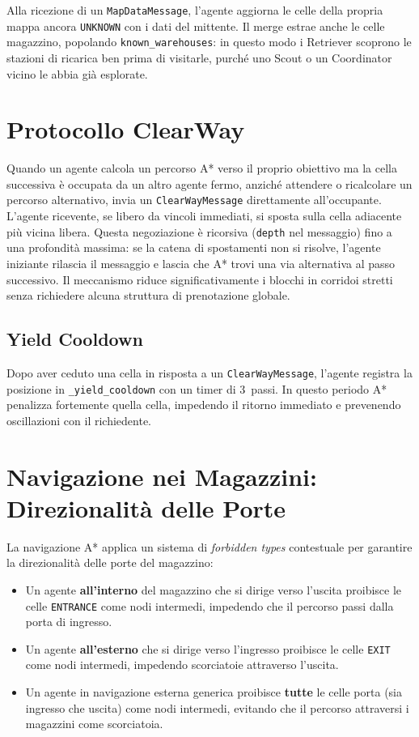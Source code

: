 Alla ricezione di un \texttt{MapDataMessage}, l'agente aggiorna le celle della propria
mappa ancora \texttt{UNKNOWN} con i dati del mittente. Il merge estrae anche le celle
magazzino, popolando \texttt{known\_warehouses}: in questo modo i Retriever scoprono
le stazioni di ricarica ben prima di visitarle, purché uno Scout o un Coordinator
vicino le abbia già esplorate.

\section{Protocollo ClearWay}

Quando un agente calcola un percorso A* verso il proprio obiettivo ma la cella successiva
\`e occupata da un altro agente fermo, anzich\'e attendere o ricalcolare un percorso
alternativo, invia un \texttt{ClearWayMessage} direttamente all'occupante. L'agente
ricevente, se libero da vincoli immediati, si sposta sulla cella adiacente pi\`u vicina
libera. Questa negoziazione \`e ricorsiva (\texttt{depth} nel messaggio) fino a una
profondità massima: se la catena di spostamenti non si risolve, l'agente iniziante
rilascia il messaggio e lascia che A* trovi una via alternativa al passo successivo.
Il meccanismo riduce significativamente i blocchi in corridoi stretti senza richiedere
alcuna struttura di prenotazione globale.

\subsection{Yield Cooldown}

Dopo aver ceduto una cella in risposta a un \texttt{ClearWayMessage}, l'agente registra
la posizione in \texttt{\_yield\_cooldown} con un timer di 3~passi. In questo periodo
A* penalizza fortemente quella cella, impedendo il ritorno immediato e prevenendo
oscillazioni con il richiedente.

\section{Navigazione nei Magazzini: Direzionalit\`a delle Porte}

La navigazione A* applica un sistema di \textit{forbidden types} contestuale per garantire
la direzionalit\`a delle porte del magazzino:

\begin{itemize}
    \item Un agente \textbf{all'interno} del magazzino che si dirige verso l'uscita
          proibisce le celle \texttt{ENTRANCE} come nodi intermedi, impedendo che il
          percorso passi dalla porta di ingresso.
    \item Un agente \textbf{all'esterno} che si dirige verso l'ingresso proibisce le
          celle \texttt{EXIT} come nodi intermedi, impedendo scorciatoie attraverso
          l'uscita.
    \item Un agente in navigazione esterna generica proibisce \textbf{tutte} le celle
          porta (sia ingresso che uscita) come nodi intermedi, evitando che il percorso
          attraversi i magazzini come scorciatoia.
\end{itemize}

